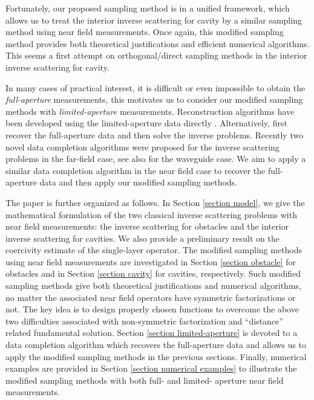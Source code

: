 \documentclass[final]{siamltex}
\begin{document}
Fortunately, our proposed sampling method is in a unified framework, which allows us to treat the interior inverse scattering for cavity by a similar sampling method using near field measurements. Once again, this modified  sampling method provides both theoretical justifications and efficient numerical algorithms. This seems a first attempt on orthogonal/direct sampling methods in the interior inverse scattering for cavity.

In many cases of practical interest, it is difficult or even impossible to obtain the {\em full-aperture} measurements, this motivates us to consider our modified sampling methods with {\em limited-aperture} measurements.  Reconstruction algorithms have been developed using the {limited-aperture} data directly
\cite{BaoLiu,ColtonMonk06,IkehataNiemiSiltanen,kirsch2008factorization,LuXuXu2012AA,MagerBleistein1978, Zinn1989}. Alternatively,  \cite{LiuSun19, LuXuXu2012AA} first recover the full-aperture data and then solve the inverse problems. Recently two novel data completion algorithms were proposed \cite{DLMZ2021} for the inverse scattering problems in the far-field case, see also \cite{BORCEA2019556} for the waveguide case. We aim to apply a similar data completion algorithm in the near field case to recover the full-aperture data  and then apply our modified sampling methods.

The paper is further organized as follows. In Section \ref{section model}, we give the mathematical formulation of the two classical inverse scattering problems with near field measurements:   the inverse scattering for obstacles and the interior inverse scattering for cavities. We also provide a preliminary result on the coercivity estimate of the single-layer operator. The modified  sampling methods using near field measurements are investigated  in Section \ref{section obstacle} for obstacles  and in Section \ref{section cavity} for cavities, respectively. Such modified sampling methods give both theoretical justifications and numerical algorithms, no matter the associated near field operators have  symmetric factorizations or not. The key idea is to design properly chosen functions to overcome the above two difficulties associated with non-symmetric factorization and ``distance'' related fundamental solution.   Section \ref{section limited-aperture} is devoted to a data completion algorithm which recovers the full-aperture data and allows us to apply the modified sampling methods in the previous sections. Finally, numerical examples are provided in Section \ref{section numerical examples} to illustrate the modified sampling methods with both full- and limited- aperture near field measurements.
\end{document}
